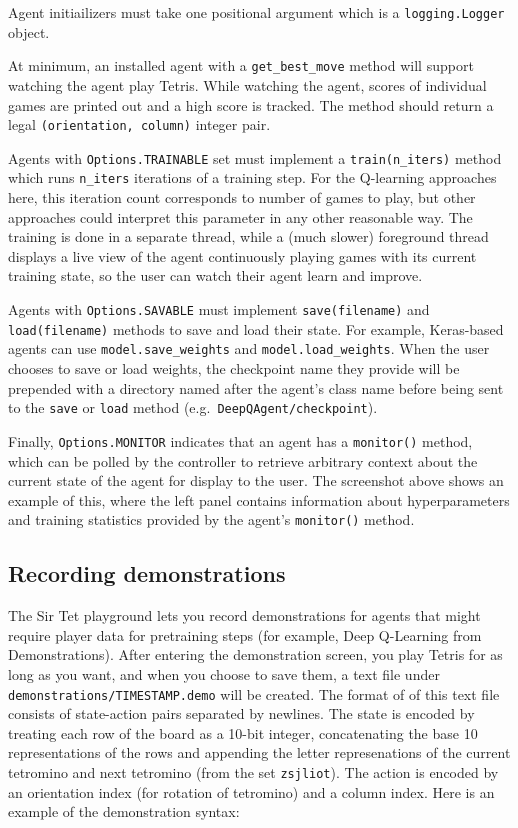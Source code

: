 \documentclass[11pt]{article}
\begin{document}
Agent initiailizers must take one positional argument which is a
\texttt{logging.Logger} object.

At minimum, an installed agent with a \texttt{get\_best\_move} method
will support watching the agent play Tetris. While watching the agent,
scores of individual games are printed out and a high score is tracked.
The method should return a legal \texttt{(orientation,\ column)} integer
pair.

Agents with \texttt{Options.TRAINABLE} set must implement a
\texttt{train(n\_iters)} method which runs \texttt{n\_iters} iterations
of a training step. For the Q-learning approaches here, this iteration
count corresponds to number of games to play, but other approaches could
interpret this parameter in any other reasonable way. The training is
done in a separate thread, while a (much slower) foreground thread
displays a live view of the agent continuously playing games with its
current training state, so the user can watch their agent learn and
improve.

Agents with \texttt{Options.SAVABLE} must implement
\texttt{save(filename)} and \texttt{load(filename)} methods to save and
load their state. For example, Keras-based agents can use
\texttt{model.save\_weights} and \texttt{model.load\_weights}. When the
user chooses to save or load weights, the checkpoint name they provide
will be prepended with a directory named after the agent's class name
before being sent to the \texttt{save} or \texttt{load} method
(e.g.~\texttt{DeepQAgent/checkpoint}).

Finally, \texttt{Options.MONITOR} indicates that an agent has a
\texttt{monitor()} method, which can be polled by the controller to
retrieve arbitrary context about the current state of the agent for
display to the user. The screenshot above shows an example of this,
where the left panel contains information about hyperparameters and
training statistics provided by the agent's \texttt{monitor()} method.

\hypertarget{recording-demonstrations}{%
\subsection{Recording demonstrations}\label{recording-demonstrations}}

The Sir Tet playground lets you record demonstrations for agents that
might require player data for pretraining steps (for example, Deep
Q-Learning from Demonstrations). After entering the demonstration
screen, you play Tetris for as long as you want, and when you choose to
save them, a text file under \texttt{demonstrations/TIMESTAMP.demo} will
be created. The format of of this text file consists of state-action
pairs separated by newlines. The state is encoded by treating each row
of the board as a 10-bit integer, concatenating the base 10
representations of the rows and appending the letter represenations of
the current tetromino and next tetromino (from the set
\texttt{zsjliot}). The action is encoded by an orientation index (for
rotation of tetromino) and a column index. Here is an example of the
demonstration syntax:
\end{document}
